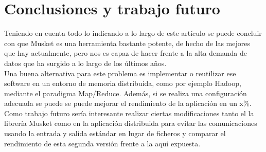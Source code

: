 \documentclass[conference]{IEEEtran}
\begin{document}
\section{Conclusiones y trabajo futuro}
Teniendo en cuenta todo lo indicando a lo largo de este artículo se puede concluir con que Musket es una herramienta bastante potente, de hecho de las mejores que hay actualmente, pero nos es capaz de hacer frente a la alta demanda de datos que ha surgido a lo largo de los últimos años.\\
Una buena alternativa para este problema es implementar o reutilizar ese software en un entorno de memoria distribuida, como por ejemplo Hadoop, mediante el paradigma Map/Reduce. Además, si se realiza una configuración adecuada se puede se puede mejorar el rendimiento de la aplicación en un x\%.\\

Como trabajo futuro sería interesante realizar ciertas modificaciones tanto el la librería Musket como en la aplicación distribuida para evitar las comunicaciones usando la entrada y salida estándar en lugar de ficheros y comparar el rendimiento de esta segunda versión frente a la aquí expuesta.
\end{document}
